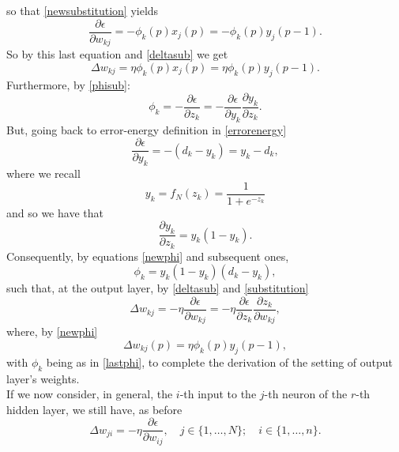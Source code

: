 \documentclass[%
    corpo=11pt,
    twoside,
    stile=classica,
    oldstyle,
    autoretitolo,
    tipotesi=magistrale,
    greek,
    evenboxes,
    english
]{toptesi}
\begin{document}
so that \eqref{newsubstitution} yields 
\begin{equation}
\frac{\partial \epsilon}{\partial w_{kj}} = - \phi_k(p)x_j(p) = -\phi_k(p)y_j(p-1).
\end{equation}
So by this last equation and \eqref{deltasub} we get
\begin{equation}
\label{graupe6p12}
\Delta w_{kj} = \eta \phi_k(p)x_j(p) = \eta \phi_k(p)y_j(p-1).
\end{equation}
Furthermore, by \eqref{phisub}:
\begin{equation}
\label{newphi}
\phi_k = - \frac{\partial \epsilon}{\partial z_k} = - \frac{\partial \epsilon}{\partial y_k} \frac{\partial y_k}{\partial z_k}.
\end{equation}
But, going back to error-energy definition in \eqref{errorenergy}
\begin{equation}
\frac{\partial \epsilon}{\partial y_k} = -\left(d_k - y_k \right) = y_k - d_k,
\end{equation}
where we recall 
\begin{equation}
y_k = f_N(z_k) = \frac{1}{1 + e^{-z_k}}
\end{equation}
and so we have that 
\begin{equation}
\label{graupe6p16}
\frac{\partial y_k}{\partial z_k} = y_k(1 - y_k).
\end{equation}
Consequently, by equations \eqref{newphi} and subsequent ones, 
\begin{equation}
\label{lastphi}
\phi_k = y_k(1 - y_k)(d_k - y_k),
\end{equation}
such that, at the output layer, by \eqref{deltasub} and \eqref{substitution}
\begin{equation}
\Delta w_{kj} = -\eta \frac{\partial \epsilon}{\partial w_{kj}} = -\eta  \frac{\partial \epsilon}{\partial z_k} \frac{\partial z_k}{\partial w_{kj}},
\end{equation}
where, by \eqref{newphi}
\begin{equation}
\Delta w_{kj}(p) = \eta \phi_k(p)y_j(p-1),
\end{equation}
with $\phi_k$ being as in \eqref{lastphi}, to complete the derivation of the setting of output layer's weights. \\
If we now consider, in general, the $i$-th input to the $j$-th neuron of the $r$-th hidden layer, we still have, as before
\begin{equation}
\Delta w_{ji} = -\eta \frac{\partial \epsilon}{\partial w_{ij}},
\quad j \in \{1,\dots,N\}; \quad i \in\{1, \dots, n \}.
\end{equation}
\end{document}
